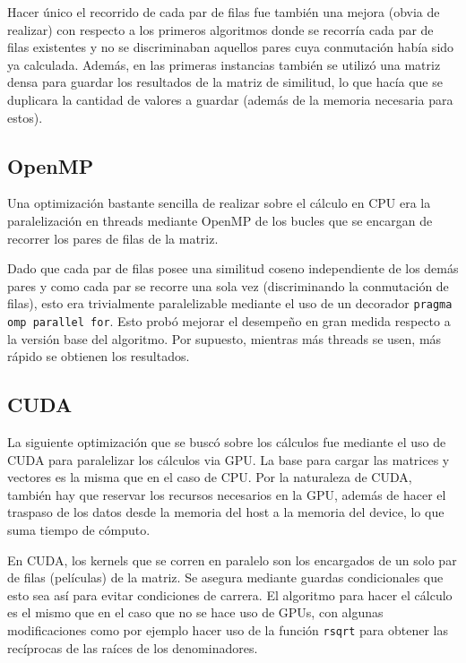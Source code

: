 \documentclass[11pt, a4paper]{article}
\begin{document}
  Hacer único el recorrido de cada par de filas fue también una mejora (obvia
  de realizar) con respecto a los primeros algoritmos donde se recorría cada
  par de filas existentes y no se discriminaban aquellos pares cuya conmutación
  había sido ya calculada. Además, en las primeras instancias también se
  utilizó una matriz densa para guardar los resultados de la matriz de
  similitud, lo que hacía que se duplicara la cantidad de valores a guardar
  (además de la memoria necesaria para estos).

  \subsection{OpenMP}

  Una optimización bastante sencilla de realizar sobre el cálculo en CPU era la
  paralelización en threads mediante OpenMP de los bucles que se encargan de
  recorrer los pares de filas de la matriz.

  Dado que cada par de filas posee una similitud coseno independiente de los
  demás pares y como cada par se recorre una sola vez (discriminando la
  conmutación de filas), esto era trivialmente paralelizable mediante el uso de
  un decorador \texttt{pragma omp parallel for}. Esto probó mejorar el
  desempeño en gran medida respecto a la versión base del algoritmo. Por
  supuesto, mientras más threads se usen, más rápido se obtienen los
  resultados.


  \subsection{CUDA}

  La siguiente optimización que se buscó sobre los cálculos fue mediante el uso
  de CUDA para paralelizar los cálculos via GPU. La base para cargar las
  matrices y vectores es la misma que en el caso de CPU. Por la naturaleza de
  CUDA, también hay que reservar los recursos necesarios en la GPU, además de
  hacer el traspaso de los datos desde la memoria del host a la memoria del
  device, lo que suma tiempo de cómputo.

  En CUDA, los kernels que se corren en paralelo son los encargados de un solo
  par de filas (películas) de la matriz. Se asegura mediante guardas
  condicionales que esto sea así para evitar condiciones de carrera. El
  algoritmo para hacer el cálculo es el mismo que en el caso que no se hace uso
  de GPUs, con algunas modificaciones como por ejemplo hacer uso de la función
  \texttt{rsqrt} para obtener las recíprocas de las raíces de los
  denominadores.
\end{document}
